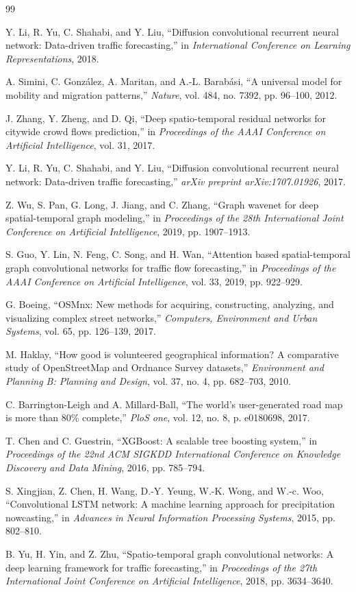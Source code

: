 \documentclass[twocolumn,11pt]{IEEEtran}
\begin{document}
\begin{thebibliography}{99}

Y. Li, R. Yu, C. Shahabi, and Y. Liu, ``Diffusion convolutional recurrent neural network: Data-driven traffic forecasting,'' in \textit{International Conference on Learning Representations}, 2018.

A. Simini, C. González, A. Maritan, and A.-L. Barabási, ``A universal model for mobility and migration patterns,'' \textit{Nature}, vol. 484, no. 7392, pp. 96--100, 2012.

J. Zhang, Y. Zheng, and D. Qi, ``Deep spatio-temporal residual networks for citywide crowd flows prediction,'' in \textit{Proceedings of the AAAI Conference on Artificial Intelligence}, vol. 31, 2017.

Y. Li, R. Yu, C. Shahabi, and Y. Liu, ``Diffusion convolutional recurrent neural network: Data-driven traffic forecasting,'' \textit{arXiv preprint arXiv:1707.01926}, 2017.

Z. Wu, S. Pan, G. Long, J. Jiang, and C. Zhang, ``Graph wavenet for deep spatial-temporal graph modeling,'' in \textit{Proceedings of the 28th International Joint Conference on Artificial Intelligence}, 2019, pp. 1907--1913.

S. Guo, Y. Lin, N. Feng, C. Song, and H. Wan, ``Attention based spatial-temporal graph convolutional networks for traffic flow forecasting,'' in \textit{Proceedings of the AAAI Conference on Artificial Intelligence}, vol. 33, 2019, pp. 922--929.

G. Boeing, ``OSMnx: New methods for acquiring, constructing, analyzing, and visualizing complex street networks,'' \textit{Computers, Environment and Urban Systems}, vol. 65, pp. 126--139, 2017.

M. Haklay, ``How good is volunteered geographical information? A comparative study of OpenStreetMap and Ordnance Survey datasets,'' \textit{Environment and Planning B: Planning and Design}, vol. 37, no. 4, pp. 682--703, 2010.

C. Barrington-Leigh and A. Millard-Ball, ``The world's user-generated road map is more than 80\% complete,'' \textit{PloS one}, vol. 12, no. 8, p. e0180698, 2017.

T. Chen and C. Guestrin, ``XGBoost: A scalable tree boosting system,'' in \textit{Proceedings of the 22nd ACM SIGKDD International Conference on Knowledge Discovery and Data Mining}, 2016, pp. 785--794.

S. Xingjian, Z. Chen, H. Wang, D.-Y. Yeung, W.-K. Wong, and W.-c. Woo, ``Convolutional LSTM network: A machine learning approach for precipitation nowcasting,'' in \textit{Advances in Neural Information Processing Systems}, 2015, pp. 802--810.

B. Yu, H. Yin, and Z. Zhu, ``Spatio-temporal graph convolutional networks: A deep learning framework for traffic forecasting,'' in \textit{Proceedings of the 27th International Joint Conference on Artificial Intelligence}, 2018, pp. 3634--3640.

\end{thebibliography}
\end{document}
